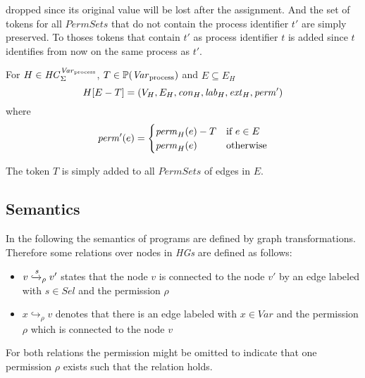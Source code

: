 	dropped since its original value will be lost after the assignment. And
	the set of tokens for all $\mathit{PermSets}$ that do not contain the
	process identifier $t'$ are simply preserved. To thoses tokens that contain
	$t'$ as process identifier $t$ is added since $t$ identifies from now on the
	same process as $t'$.
	\begin{definition}
		For $H\in\mathit{HC}_{\Sigma}^{\mathit{Var}_{\text{process}}}$, $T\in\mathbb{P}(\mathit{Var}_{\text{process}})$ and $E\subseteq E_{H}$
		\begin{equation*}
			H[E-T] = (V_{H}, E_{H}, \mathit{con}_{H}, \mathit{lab}_{H}, \mathit{ext}_{H}, \mathit{perm}')
		\end{equation*}
		where
		\begin{equation*}
			\mathit{perm}'(e) =
			\begin{cases}
				\mathit{perm}_{H}(e) - T &\text{if }e\in E\\
				\mathit{perm}_{H}(e)     &\text{otherwise}\\
			\end{cases}
		\end{equation*}
	\end{definition}
	The token $T$ is simply added to all $\mathit{PermSets}$ of edges in $E$.
	\subsection{Semantics}
	In the following the semantics of programs are defined
	by graph transformations. Therefore some relations over nodes in
	\emph{\acp{HG}} are defined as follows:
	\begin{itemize}
		\item $v\xhookrightarrow{s}_{\rho}v'$ states that the node $v$ is
			connected to the node $v'$ by an edge labeled with $s\in\mathit{Sel}$
			and the permission $\rho$
		\item $x\hookrightarrow_{\rho}v$ denotes that there is an edge labeled
			with $x\in\mathit{Var}$ and the permission $\rho$ which is connected
			to the node $v$
	\end{itemize}
	For both relations the permission might be omitted to indicate that one
	permission $\rho$ exists such that the relation holds.

